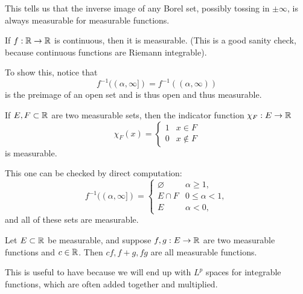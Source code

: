 This tells us that the inverse image of any Borel set, possibly tossing in $\pm \infty$, is always measurable for measurable functions. 

\begin{example}\label{contimplmeas}
If $f: \mathbb R \to \mathbb R$ is continuous, then it is measurable. (This is a good sanity check, because continuous functions are Riemann integrable).  
\end{example}

To show this, notice that 
\[
    f^{-1}((\alpha, \infty]) = f^{-1}((\alpha, \infty))
\]
is the preimage of an open set and is thus open and thus measurable.

\begin{example}
If $E, F \subset \mathbb R$ are two measurable sets, then the indicator function $\chi_F: E \to \mathbb R$
\[
    \chi_F(x) = \begin{cases} 1 & x \in F \\ 0 & x \not\in F \end{cases}
\]
is measurable.
\end{example}

This one can be checked by direct computation: 
\[
    f^{-1}((\alpha, \infty]) = \begin{cases} \varnothing & \alpha \ge 1, \\ E \cap F & 0 \le \alpha < 1, \\ E & \alpha < 0,\end{cases}
\]
and all of these sets are measurable. 

\begin{theorem}
Let $E \subset \mathbb R$ be measurable, and suppose $f, g: E \to \mathbb R$ are two measurable functions and $c \in \mathbb R$. Then $cf, f+g, fg$ are all measurable functions.
\end{theorem}

This is useful to have because we will end up with $L^p$ spaces for integrable functions, which are often added together and multiplied.

